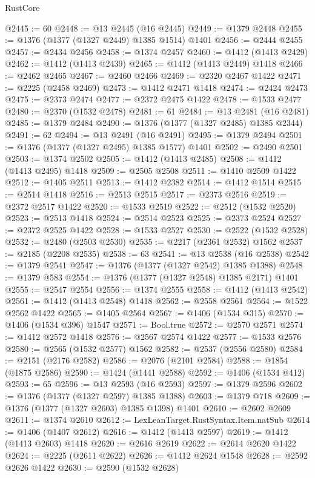 \begin{lexlean}{RustCore}
\begin{coremodule}
@2445 := 60
@2448 := @13 @2445 (@16 @2445)
@2449 := @1379 @2448
@2455 := @1376 (@1377 (@1327 @2449) @1385 @1514) @1401
@2456 := @2444 @2455
@2457 := @2434 @2456
@2458 := @1374 @2457
@2460 := @1412 (@1413 @2429)
@2462 := @1412 (@1413 @2439)
@2465 := @1412 (@1413 @2449) @1418
@2466 := @2462 @2465
@2467 := @2460 @2466
@2469 := @2320 @2467 @1422
@2471 := @2225 (@2458 @2469)
@2473 := @1412 @2471 @1418
@2474 := @2424 @2473
@2475 := @2373 @2474
@2477 := @2372 @2475 @1422
@2478 := @1533 @2477
@2480 := @2370 (@1532 @2478)
@2481 := 61
@2484 := @13 @2481 (@16 @2481)
@2485 := @1379 @2484
@2490 := @1376 (@1377 (@1327 @2485) @1385 @2344)
@2491 := 62
@2494 := @13 @2491 (@16 @2491)
@2495 := @1379 @2494
@2501 := @1376 (@1377 (@1327 @2495) @1385 @1577) @1401
@2502 := @2490 @2501
@2503 := @1374 @2502
@2505 := @1412 (@1413 @2485)
@2508 := @1412 (@1413 @2495) @1418
@2509 := @2505 @2508
@2511 := @1410 @2509 @1422
@2512 := @1405 @2511
@2513 := @1412 @2382
@2514 := @1412 @1514
@2515 := @2514 @1418
@2516 := @2513 @2515
@2517 := @2373 @2516
@2519 := @2372 @2517 @1422
@2520 := @1533 @2519
@2522 := @2512 (@1532 @2520)
@2523 := @2513 @1418
@2524 := @2514 @2523
@2525 := @2373 @2524
@2527 := @2372 @2525 @1422
@2528 := @1533 @2527
@2530 := @2522 (@1532 @2528)
@2532 := @2480 (@2503 @2530)
@2535 := @2217 (@2361 @2532) @1562
@2537 := @2185 (@2208 @2535)
@2538 := 63
@2541 := @13 @2538 (@16 @2538)
@2542 := @1379 @2541
@2547 := @1376 (@1377 (@1327 @2542) @1385 @1388)
@2548 := @1379 @583
@2554 := @1376 (@1377 (@1327 @2548) @1385 @2171) @1401
@2555 := @2547 @2554
@2556 := @1374 @2555
@2558 := @1412 (@1413 @2542)
@2561 := @1412 (@1413 @2548) @1418
@2562 := @2558 @2561
@2564 := @1522 @2562 @1422
@2565 := @1405 @2564
@2567 := @1406 (@1534 @315)
@2570 := @1406 (@1534 @396) @1547
@2571 := Bool.true
@2572 := @2570 @2571
@2574 := @1412 @2572 @1418
@2576 := @2567 @2574 @1422
@2577 := @1533 @2576
@2580 := @2565 (@1532 @2577) @1562
@2582 := @2537 (@2556 @2580)
@2584 := @2151 (@2176 @2582)
@2586 := @2076 (@2101 @2584)
@2588 := @1854 (@1875 @2586)
@2590 := @1424 (@1441 @2588)
@2592 := @1406 (@1534 @412)
@2593 := 65
@2596 := @13 @2593 (@16 @2593)
@2597 := @1379 @2596
@2602 := @1376 (@1377 (@1327 @2597) @1385 @1388)
@2603 := @1379 @718
@2609 := @1376 (@1377 (@1327 @2603) @1385 @1398) @1401
@2610 := @2602 @2609
@2611 := @1374 @2610
@2612 := LexLeanTarget.RustSyntax.Item.natSub
@2614 := @1406 (@1407 @2612)
@2616 := @1412 (@1413 @2597)
@2619 := @1412 (@1413 @2603) @1418
@2620 := @2616 @2619
@2622 := @2614 @2620 @1422
@2624 := @2225 (@2611 @2622)
@2626 := @1412 @2624 @1548
@2628 := @2592 @2626 @1422
@2630 := @2590 (@1532 @2628)

\end{coremodule}
\end{lexlean}
